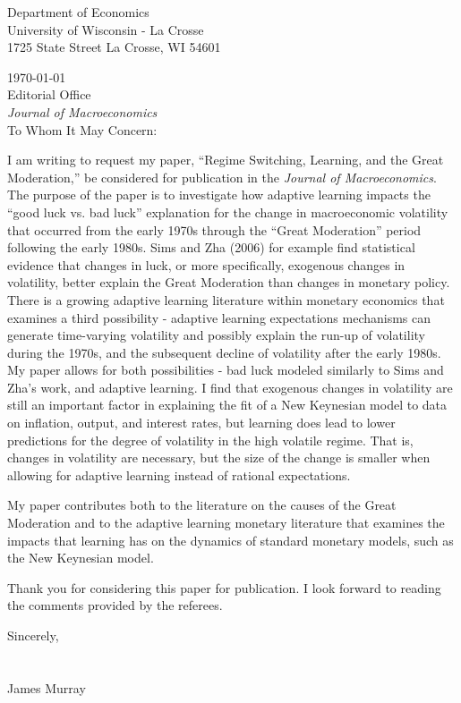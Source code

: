 \documentclass[12pt]{letter}
\begin{document}
\vspace*{-0.5in}

Department of Economics\\
University of Wisconsin - La Crosse\\
1725 State Street
La Crosse, WI  54601

\today\\

Editorial Office\\
\textit{Journal of Macroeconomics}\\ 

To Whom It May Concern:

I am writing to request my paper, ``Regime Switching, Learning, and the Great Moderation,'' be considered for publication in the \textit{Journal of Macroeconomics}.  The purpose of the paper is to investigate how adaptive learning impacts the ``good luck vs. bad luck'' explanation for the change in macroeconomic volatility that occurred from the early 1970s through the ``Great Moderation'' period following the early 1980s.  Sims and Zha (2006) for example find statistical evidence that changes in luck, or more specifically, exogenous changes in volatility, better explain the Great Moderation than changes in monetary policy.  There is a growing adaptive learning literature within monetary economics that examines a third possibility - adaptive learning expectations mechanisms can generate time-varying volatility and possibly explain the run-up of volatility during the 1970s, and the subsequent decline of volatility after the early 1980s.  My paper allows for both possibilities - bad luck modeled similarly to Sims and Zha's work, and adaptive learning.  I find that exogenous changes in volatility are still an important factor in explaining the fit of a New Keynesian model to data on inflation, output, and interest rates, but learning does lead to lower predictions for the degree of volatility in the high volatile regime.  That is, changes in volatility are necessary, but the size of the change is smaller when allowing for adaptive learning instead of rational expectations.

My paper contributes both to the literature on the causes of the Great Moderation and to the adaptive learning monetary literature that examines the impacts that learning has on the dynamics of standard monetary models, such as the New Keynesian model. 

Thank you for considering this paper for publication.  I look forward to reading the comments provided by the referees.

Sincerely,\\\\\\
James Murray
\end{document}
